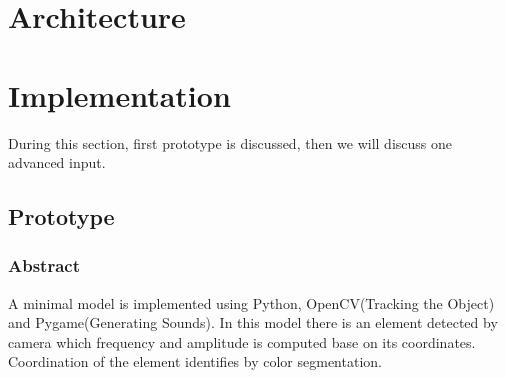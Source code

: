 \documentclass{report}
\begin{document}
\section{Architecture}



\pagebreak
\section{Implementation}
During this section, first prototype is discussed, then we will discuss one advanced input. 



\subsection{Prototype}

\subsubsection{Abstract}{A minimal model is implemented using Python, OpenCV(Tracking the Object) and Pygame(Generating Sounds). In this model there is an element detected by camera which frequency and amplitude is computed base on its coordinates. Coordination of the element identifies by color segmentation.}

\end{document}
